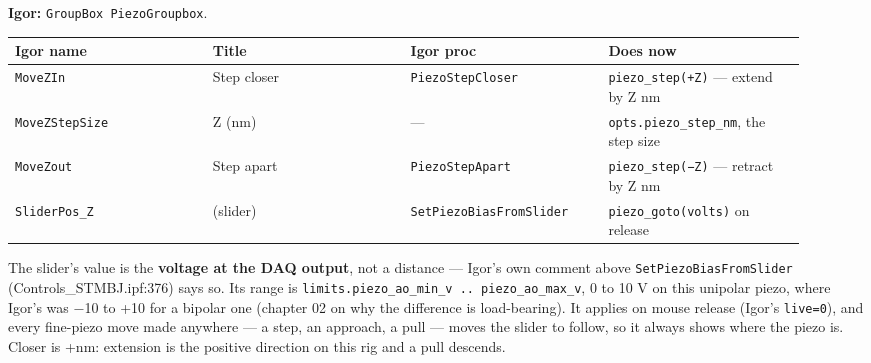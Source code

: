 \textbf{Igor:} \texttt{Group\discretionary{}{}{}Box Piezo\discretionary{}{}{}Groupbox}.

\small\setlength{\LTleft}{0pt}\setlength{\LTright}{\fill}
\begin{longtable}{@{}>{\raggedright\arraybackslash}p{0.230\linewidth}>{\raggedright\arraybackslash}p{0.230\linewidth}>{\raggedright\arraybackslash}p{0.230\linewidth}>{\raggedright\arraybackslash}p{0.230\linewidth}@{}}
\toprule
\textbf{Igor name} & \textbf{Title} & \textbf{Igor proc} & \textbf{Does now} \\
\midrule\endhead
\texttt{Move\discretionary{}{}{}ZIn} & Step closer & \texttt{Piezo\discretionary{}{}{}Step\discretionary{}{}{}Closer} & \texttt{piezo\_\discretionary{}{}{}step(+Z)} --- extend by Z nm \\
\texttt{Move\discretionary{}{}{}ZStep\discretionary{}{}{}Size} & Z (nm) & --- & \texttt{opts.\discretionary{}{}{}piezo\_\discretionary{}{}{}step\_\discretionary{}{}{}nm}, the step size \\
\texttt{Move\discretionary{}{}{}Zout} & Step apart & \texttt{Piezo\discretionary{}{}{}Step\discretionary{}{}{}Apart} & \texttt{piezo\_\discretionary{}{}{}step(−Z)} --- retract by Z nm \\
\texttt{Slider\discretionary{}{}{}Pos\_\discretionary{}{}{}Z} & (slider) & \texttt{Set\discretionary{}{}{}Piezo\discretionary{}{}{}Bias\discretionary{}{}{}From\discretionary{}{}{}Slider} & \texttt{piezo\_\discretionary{}{}{}goto(volts)} on release \\
\bottomrule
\end{longtable}
\normalsize

The slider's value is the \textbf{voltage at the DAQ output}, not a distance --- Igor's own comment above \texttt{Set\discretionary{}{}{}Piezo\discretionary{}{}{}Bias\discretionary{}{}{}From\discretionary{}{}{}Slider} (Controls\_STMBJ.ipf:376) says so. Its range is \texttt{limits.\discretionary{}{}{}piezo\_\discretionary{}{}{}ao\_\discretionary{}{}{}min\_\discretionary{}{}{}v .\discretionary{}{}{}.\discretionary{}{}{} piezo\_\discretionary{}{}{}ao\_\discretionary{}{}{}max\_\discretionary{}{}{}v}, 0 to 10 V on this unipolar piezo, where Igor's was −10 to +10 for a bipolar one (chapter 02 on why the difference is load-bearing). It applies on mouse release (Igor's \texttt{live=0}), and every fine-piezo move made anywhere --- a step, an approach, a pull --- moves the slider to follow, so it always shows where the piezo is. Closer is +nm: extension is the positive direction on this rig and a pull descends.

